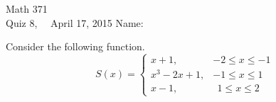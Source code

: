 \documentclass[addpoints, 11pt]{exam}
\begin{document}
Math 371 \\
Quiz 8, \ \ April 17, 2015
\hspace{2.in}
{Name:} {\underline {\hspace{2.15in}}} \\ \normalsize
\begin{questions}

\question Consider the following function.
$$
S(x) = 
\begin{cases}
x+1, & -2 \leq x \leq -1 \\
x^3-2x+1, & -1 \leq x \leq 1 \\
x-1, & ~~1 \leq x \leq 2 
\end{cases}
$$
\end{questions}
\end{document}
